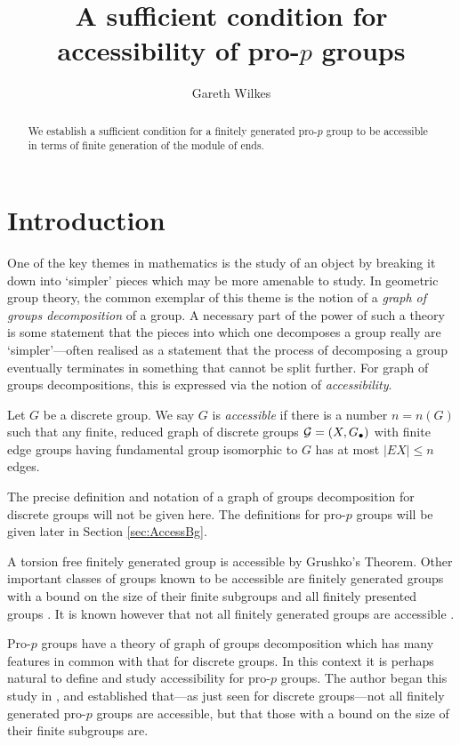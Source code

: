 \documentclass[draft, a4paper]{article}
\title{A sufficient condition for accessibility of pro-$p$ groups}
\author{Gareth Wilkes}
\begin{document}
\maketitle
\begin{abstract}
We establish a sufficient condition for a finitely generated pro-$p$ group to be accessible in terms of finite generation of the module of ends.
\end{abstract}
\section{Introduction}
One of the key themes in mathematics is the study of an object by breaking it down into `simpler' pieces which may be more amenable to study. In geometric group theory, the common exemplar of this theme is the notion of a {\em graph of groups decomposition} of a group. A necessary part of the power of such a theory is some statement that the pieces into which one decomposes a group really are `simpler'---often realised as a statement that the process of decomposing a group eventually terminates in something that cannot be split further. For graph of groups decompositions, this is expressed via the notion of {\em accessibility}. 

\begin{defn}
Let $G$ be a discrete group. We say $G$ is {\em accessible} if there is a number $n = n(G)$ such that any finite, reduced graph of discrete groups ${\cal G}=(X,G_\bullet)$ with finite edge groups having fundamental group isomorphic to $G$ has at most $|EX| \leq n$ edges.
\end{defn}
The precise definition and notation of a graph of groups decomposition  for discrete groups will not be given here. The definitions for pro-$p$ groups will be given later in Section \ref{sec:AccessBg}.

A torsion free finitely generated group is accessible by Grushko's Theorem. Other important classes of groups known to be accessible are finitely generated groups with a bound on the size of their finite subgroups \cite{Linnell83} and all finitely presented groups \cite{Dunwoody85}. It is known however that not all finitely generated groups are accessible \cite{Dunwoody93}.

Pro-$p$ groups have a theory of graph of groups decomposition which has many features in common with that for discrete groups. In this context it is perhaps natural to define and study accessibility for pro-$p$ groups. The author began this study in \cite{Wilkes19}, and established that---as just seen for discrete groups---not all finitely generated pro-$p$ groups are accessible, but that those with a bound on the size of their finite subgroups are.
\end{document}
